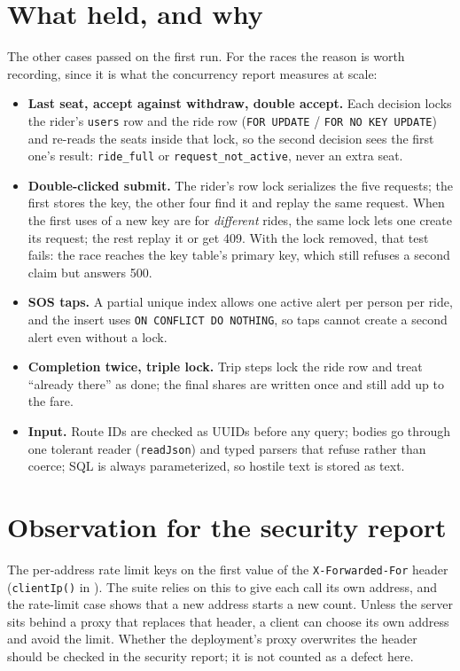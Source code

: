 \documentclass[10pt]{article}
\begin{document}
\section{What held, and why}
The other cases passed on the first run. For the races the reason is worth recording, since it is
what the concurrency report measures at scale:
\begin{itemize}
  \item \textbf{Last seat, accept against withdraw, double accept.} Each decision locks the
    rider's \texttt{users} row and the ride row (\texttt{FOR UPDATE} / \texttt{FOR NO KEY
    UPDATE}) and re-reads the seats inside that lock, so the second decision sees the first one's
    result: \texttt{ride\_full} or \texttt{request\_not\_active}, never an extra seat.
  \item \textbf{Double-clicked submit.} The rider's row lock serializes the five requests; the
    first stores the key, the other four find it and replay the same request. When the first
    uses of a new key are for \emph{different} rides, the same lock lets one create its request;
    the rest replay it or get 409. With the lock removed, that test fails: the race reaches the
    key table's primary key, which still refuses a second claim but answers 500.
  \item \textbf{SOS taps.} A partial unique index allows one active alert per person per ride,
    and the insert uses \texttt{ON CONFLICT DO NOTHING}, so taps cannot create a second alert even
    without a lock.
  \item \textbf{Completion twice, triple lock.} Trip steps lock the ride row and treat ``already
    there'' as done; the final shares are written once and still add up to the fare.
  \item \textbf{Input.} Route IDs are checked as UUIDs before any query; bodies go through one
    tolerant reader (\texttt{readJson}) and typed parsers that refuse rather than coerce; SQL is
    always parameterized, so hostile text is stored as text.
\end{itemize}

\section{Observation for the security report}
The per-address rate limit keys on the first value of the \texttt{X-Forwarded-For} header
(\texttt{clientIp()} in ). The suite relies on this to give each call its own
address, and the rate-limit case shows that a new address starts a new count. Unless the server
sits behind a proxy that replaces that header, a client can choose its own address and avoid the
limit. Whether the deployment's proxy overwrites the header should be checked in the security
report; it is not counted as a defect here.
\end{document}
